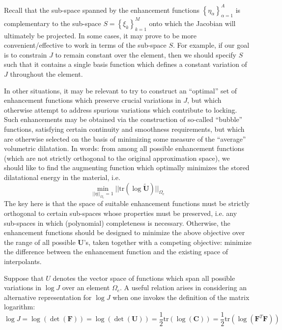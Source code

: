 Recall that the sub-space spanned by the enhancement functions $\left\{ \eta_{\alpha} \right\}_{\alpha = 1}^A$ is complementary to the sub-space $S = \left\{ \xi_k \right\}_{k = 1}^M$ onto which the Jacobian will ultimately be projected. In some cases, it may prove to be more convenient/effective to work in terms of the sub-space $S$. For example, if our goal is to constrain $J$ to remain constant over the element, then we should specify $S$ such that it contains a single basis function which defines a constant variation of $J$ throughout the element.

In other situations, it may be relevant to try to construct an ``optimal'' set of enhancement functions which preserve crucial variations in $J$, but which otherwise attempt to address spurious variations which contribute to locking. Such enhancements may be obtained via the construction of so-called ``bubble'' functions, satisfying certain continuity and smoothness requirements, but which are otherwise selected on the basis of minimizing some measure of the ``average'' volumetric dilatation. In words: from among all possible enhancement functions (which are not strictly orthogonal to the original approximation space), we should like to find the augmenting function which optimally minimizes the stored dilatational energy in the material, i.e.
\begin{equation}
  \min_{|| \eta ||_{\Omega_e} = 1} || \text{tr} (\log \tilde{\mathbf{U}}) ||_{\Omega_e}
\end{equation}
The key here is that the space of suitable enhancement functions must be strictly orthogonal to certain sub-spaces whose properties must be preserved, i.e. any sub-spaces in which (polynomial) completeness is necessary. Otherwise, the enhancement functions should be designed to minimize the above objective over the range of all possible $\mathbf{U}$'s, taken together with a competing objective: minimize the difference between the enhancement function and the existing space of interpolants.

Suppose that $U$ denotes the vector space of functions which span all possible variations in $\log J$ over an element $\Omega_e$. A useful relation arises in considering an alternative representation for $\log J$ when one invokes the definition of the matrix logarithm:
\begin{equation}
  \log J = \log (\det (\mathbf{F})) = \log (\det (\mathbf{U})) = \frac{1}{2} \text{tr} (\log (\mathbf{C})) = \frac{1}{2} \text{tr} (\log (\mathbf{F}^T \mathbf{F}))
\end{equation}

